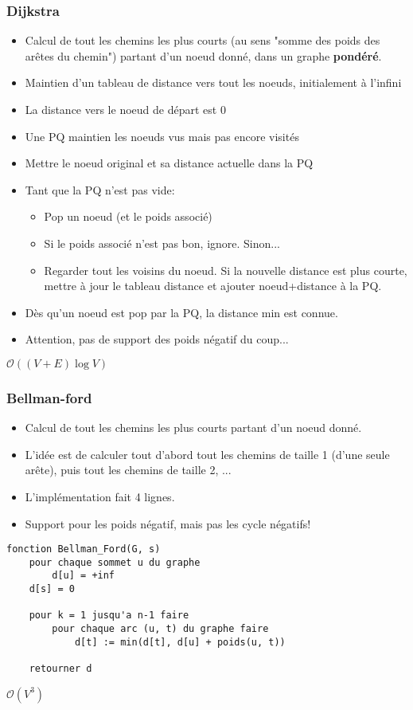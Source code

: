 \documentclass[8pt,aspectratio=169]{beamer}
\begin{document}
\begin{frame}
\frametitle{Dijkstra}
\begin{itemize}
	\item Calcul de tout les chemins les plus courts (au sens "somme des poids des arêtes du chemin") partant d'un noeud donné, dans un graphe \textbf{pondéré}.
	\item Maintien d'un tableau de distance vers tout les noeuds, initialement à l'infini
	\item La distance vers le noeud de départ est 0
	\item Une PQ maintien les noeuds vus mais pas encore visités
	\item Mettre le noeud original et sa distance actuelle dans la PQ
	\item Tant que la PQ n'est pas vide:
	\begin{itemize}
		\item Pop un noeud (et le poids associé)
		\item Si le poids associé n'est pas bon, ignore. Sinon...
		\item Regarder tout les voisins du noeud. Si la nouvelle distance est plus courte, mettre à jour le tableau distance et ajouter noeud+distance à la PQ.
	\end{itemize}
	\item Dès qu'un noeud est pop par la PQ, la distance min est connue.
	\item Attention, pas de support des poids négatif du coup...
\end{itemize}
$\mathcal{O}((V+E)\log V)$
\end{frame}

\begin{frame}[fragile]
\frametitle{Bellman-ford}
\begin{itemize}
	\item Calcul de tout les chemins les plus courts partant d'un noeud donné.
	\item L'idée est de calculer tout d'abord tout les chemins de taille 1 (d'une seule arête), puis tout les chemins de taille 2, ...
	\item L'implémentation fait 4 lignes.
	\item Support pour les poids négatif, mais pas les cycle négatifs!
\end{itemize}

\begin{lstlisting}
fonction Bellman_Ford(G, s) 
	pour chaque sommet u du graphe
		d[u] = +inf
	d[s] = 0

	pour k = 1 jusqu'a n-1 faire
		pour chaque arc (u, t) du graphe faire
			d[t] := min(d[t], d[u] + poids(u, t))
	
	retourner d
\end{lstlisting}
$\mathcal{O}(V^3)$
\end{frame}
\end{document}
